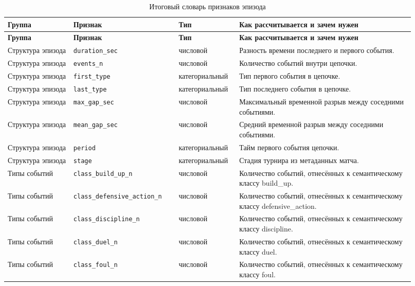 \begin{landscape}
\scriptsize
\setlength{\tabcolsep}{4pt}
\begin{longtable}{>{\raggedright\arraybackslash}p{0.15\linewidth}>{\raggedright\arraybackslash}p{0.24\linewidth}>{\raggedright\arraybackslash}p{0.13\linewidth}>{\raggedright\arraybackslash}p{0.40\linewidth}}
\caption{Итоговый словарь признаков эпизода}\label{tab:feature-dictionary}\\
\toprule
\textbf{Группа} & \textbf{Признак} & \textbf{Тип} & \textbf{Как рассчитывается и зачем нужен} \\
\midrule
\endfirsthead
\toprule
\textbf{Группа} & \textbf{Признак} & \textbf{Тип} & \textbf{Как рассчитывается и зачем нужен} \\
\midrule
\endhead
Структура эпизода & \texttt{duration\_sec} & числовой & Разность времени последнего и первого события. \\
Структура эпизода & \texttt{events\_n} & числовой & Количество событий внутри цепочки. \\
Структура эпизода & \texttt{first\_type} & категориальный & Тип первого события в цепочке. \\
Структура эпизода & \texttt{last\_type} & категориальный & Тип последнего события в цепочке. \\
Структура эпизода & \texttt{max\_gap\_sec} & числовой & Максимальный временной разрыв между соседними событиями. \\
Структура эпизода & \texttt{mean\_gap\_sec} & числовой & Средний временной разрыв между соседними событиями. \\
Структура эпизода & \texttt{period} & категориальный & Тайм первого события цепочки. \\
Структура эпизода & \texttt{stage} & категориальный & Стадия турнира из метаданных матча. \\
Типы событий & \texttt{class\_build\_up\_n} & числовой & Количество событий, отнесённых к семантическому классу build\_up. \\
Типы событий & \texttt{class\_defensive\_action\_n} & числовой & Количество событий, отнесённых к семантическому классу defensive\_action. \\
Типы событий & \texttt{class\_discipline\_n} & числовой & Количество событий, отнесённых к семантическому классу discipline. \\
Типы событий & \texttt{class\_duel\_n} & числовой & Количество событий, отнесённых к семантическому классу duel. \\
Типы событий & \texttt{class\_foul\_n} & числовой & Количество событий, отнесённых к семантическому классу foul. \\

\end{longtable}
\end{landscape}

